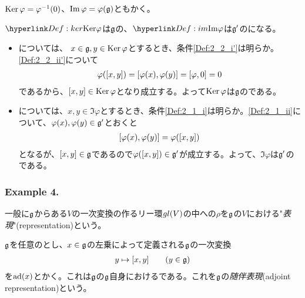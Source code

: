 \documentclass[../main]{subfiles}
\begin{document}
\begin{remark}
  $\operatorname{Ker}\varphi=\varphi^{-1}(0)$、$\Im\varphi=\varphi(\mathfrak{g})$ともかく。
\end{remark}

\begin{theorem}\label{thm:ker_im}
  $\hlin{Def:ker}{\Ker}\varphi$は$\mathfrak{g}$の{}、$\hlin{Def:im}{\Im}\varphi$は$\mathfrak{g}^{\prime}$の{}になる。
\end{theorem}

\begin{Proof}
  \begin{itemize}
    \item {}については、
      $x\in\mathfrak{g},y\in\operatorname{Ker}\varphi$とするとき、条件\ref{Def:2_2_i'}は明らか。\ref{Def:2_2_ii'}について
      \begin{align*}
        \varphi\qty(\comm{x}{y}) = \comm{\varphi(x)}{\varphi(y)}=\comm{\varphi}{0}=0
      \end{align*}
      であるから、$\comm{x}{y}\in\Ker\varphi$となり成立する。よって$\operatorname{Ker}\varphi$は$\mathfrak{g}$の{}である。
    \item {}については、$x,y\in\Im\varphi$とするとき、条件\ref{Def:2_1_i}は明らか。\ref{Def:2_1_ii}について、$\varphi(x),\varphi(y)\in\mathfrak{g}^{\prime}$とおくと
      \begin{align*}
        \comm{\varphi(x)}{\varphi(y)} = \varphi\qty(\comm{x}{y})
      \end{align*}
      となるが、$\comm{x}{y}\in\g$であるので$\varphi\qty(\comm{x}{y})\in\g^{\prime}$が成立する。よって、$\Im\varphi$は$\mathfrak{g}^{\prime}$の{}である。
  \end{itemize}
\end{Proof}

\subsubsection*{Example 4.}
\begin{definition}[表現]\label{Def:rep}
  一般に{}$\mathfrak{g}$からある$V$の一次変換の作るリー環$gl(V)$の中への{}$\rho$を$\mathfrak{g}$の$V$における"\emph{表現}"(representation)という。
\end{definition}

\begin{definition}[随伴表現]\label{Def:adj_rep}
  $\mathfrak{g}$を任意の{}とし、$x\in\mathfrak{g}$の左乗によって定義される$\mathfrak{g}$の一次変換
  \begin{align*}
    y\mapsto\comm{x}{y}\qq{}(y\in\g)
  \end{align*}
  を$\operatorname{ad}(x)$とかく。これは$\mathfrak{g}$の$\mathfrak{g}$自身における{}である。これを$\mathfrak{g}$の\emph{随伴表現}(adjoint representation)という。
\end{definition}
\end{document}
